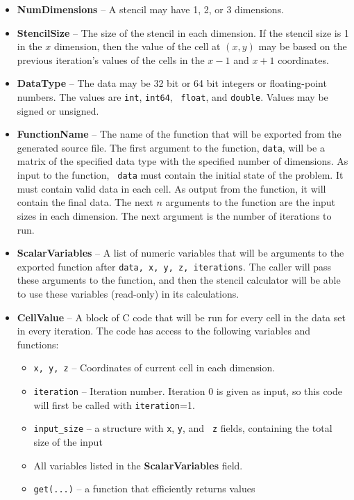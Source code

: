 \documentclass[preprint,nocopyrightspace]{styles/sigplanconf}
\begin{document}
\begin{itemize}
\item {\bf NumDimensions} -- A stencil may have 1, 2, or 3 dimensions.
\item {\bf StencilSize} -- The size of the stencil in each dimension.
  If the stencil size is 1 in the $x$ dimension, then the value of the
  cell at $(x, y)$ may be based on the previous iteration's values of
  the cells in the $x-1$ and $x+1$ coordinates.
\item {\bf DataType} -- The data may be 32 bit or 64 bit integers or
  floating-point numbers.  The values are {\tt int}, {\tt int64}, {\tt
    float}, and {\tt double}.  Values may be signed or unsigned.
\item {\bf FunctionName} -- The name of the function that will be exported
  from the generated source file.  The first argument to the function,
  {\tt data}, will be a matrix of the specified data type with the
  specified number of dimensions.  As input to the function, {\tt
    data} must contain the initial state of the problem.  It must
  contain valid data in each cell.  As
  output from the function, it will contain the final data.  The next
  $n$ arguments to the function are the input sizes in each dimension.
  The next argument is the number of iterations to run.
\item {\bf ScalarVariables} -- A list of numeric variables that will
  be arguments to the exported function after {\tt data, x, y, z,
    iterations}.  The caller will pass these arguments to the
  function, and then the stencil calculator will be able to use these
  variables (read-only) in its calculations.
\item {\bf CellValue} -- A block of C code that will be run for every
  cell in the data set in every iteration.  The code has access to the
  following variables and functions:
\begin{itemize}
\item {\tt x, y, z} -- Coordinates of current cell in each dimension.
\item {\tt iteration} -- Iteration number.  Iteration 0 is
  given as input, so this code will first be called with {\tt iteration}=1.
\item {\tt input\_size} -- a structure with {\tt x}, {\tt y}, and {\tt
  z} fields, containing the total size of the input
\item All variables listed in the {\bf ScalarVariables} field.
\item {\tt get(...)} -- a function that efficiently returns values

\end{itemize}
\end{itemize}
\end{document}
